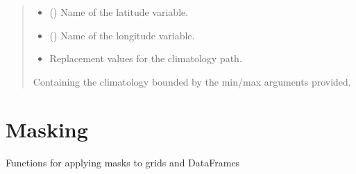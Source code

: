 \documentclass[letterpaper,10pt,english]{sphinxmanual}
\begin{document}
\begin{fulllineitems}
\begin{quote}
\begin{description}
\begin{itemize}
\item {}
\sphinxAtStartPar
{} () \textendash{} Name of the latitude variable.

\item {}
\sphinxAtStartPar
{} () \textendash{} Name of the longitude variable.

\item {}
\sphinxAtStartPar
{} \textendash{} Replacement values for the climatology path.

\end{itemize}

\sphinxAtStartPar
{} \textendash{} Containing the climatology bounded by the min/max arguments provided.

\sphinxAtStartPar
{}

\end{description}\end{quote}

\end{fulllineitems}



\section{Masking}
\label{\detokenize{misc:module-glomar_gridding.mask}}\label{\detokenize{misc:masking}}
\sphinxAtStartPar
Functions for applying masks to grids and DataFrames
\end{document}
